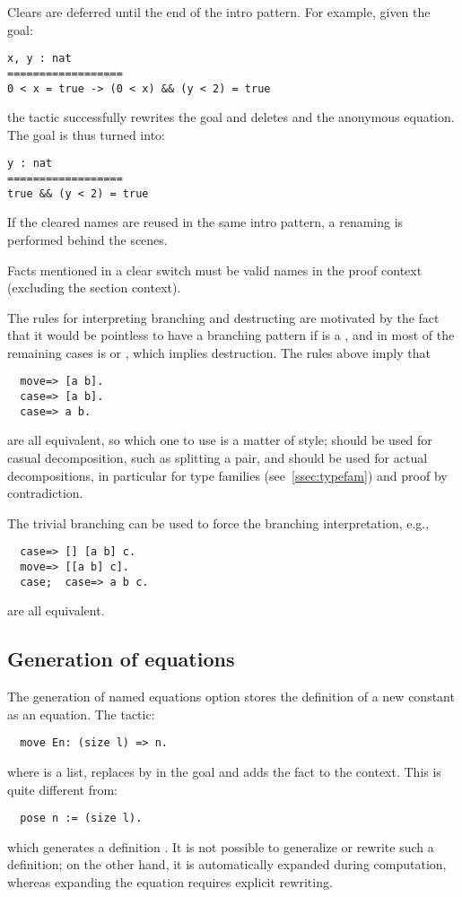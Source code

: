 Clears are deferred until the end of the intro pattern. For
example, given the goal:
\begin{lstlisting}
x, y : nat
==================
0 < x = true -> (0 < x) && (y < 2) = true
\end{lstlisting}
the tactic  successfully rewrites the goal and
deletes  and the anonymous equation. The goal is thus turned into:
\begin{lstlisting}
y : nat
==================
true && (y < 2) = true
\end{lstlisting}
If the cleared names are reused in the same intro pattern, a renaming
is performed behind the scenes.

Facts mentioned in a clear switch must be valid
names in the proof context (excluding the section context).

The rules for interpreting branching and destructing 
are motivated by the fact that it would be pointless to have a branching
pattern if {\tac} is a , and in most of the remaining cases
{\tac} is  or , which implies destruction.
The rules above imply that
\begin{lstlisting}
  move=> [a b].
  case=> [a b].
  case=> a b.
\end{lstlisting}
are all equivalent, so which one to use is a matter of style;
 should be used for casual decomposition,
such as splitting a pair, and  should be used for actual decompositions,
in particular for type families (see~\ref{ssec:typefam})
and proof by contradiction.

The trivial branching  can be used to force the branching
interpretation, e.g.,
\begin{lstlisting}
  case=> [] [a b] c.
  move=> [[a b] c].
  case;  case=> a b c.
\end{lstlisting}
are all equivalent.

\subsection{Generation of equations}\label{ssec:equations}

The generation of named equations option stores the definition of a
new constant as an equation. The tactic:
\begin{lstlisting}
  move En: (size l) => n.
\end{lstlisting}
where  is a list, replaces  by  in the goal and
adds the fact  to the context.
 This is quite different from:
\begin{lstlisting}
  pose n := (size l).
\end{lstlisting}
which generates a definition . It is not possible to
generalize or
rewrite such a definition; on the other hand, it is automatically
expanded during
computation, whereas expanding the equation  requires explicit
rewriting.

